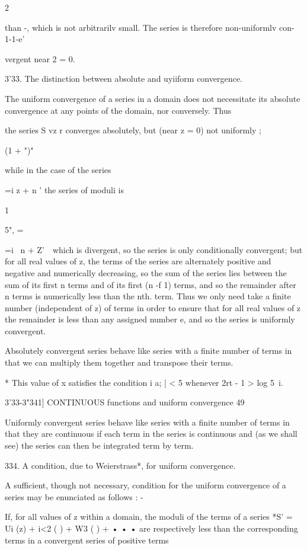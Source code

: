 2

than -, which is not arbitrarilv small. The series is therefore
non-uniformlv con- 1-1-e'

vergent near 2 = 0.

3'33. The distinction between absolute and uyiiform convergence.

The uniform convergence of a series in a domain does not necessitate
its absolute convergence at any points of the domain, nor conversely.
Thus

the series S vz r converges absolutely, but (near z = 0) not uniformly
;

(1 + ")"

while in the case of the series

 =i z + n ' the series of moduli is

1

5", =



 =i \ n + Z'\ \ which is divergent, so the series is only
conditionally convergent; but for all real values of z, the terms of
the series are alternately positive and negative and numerically
decreasing, so the sum of the series lies between the sum of its first
n terms and of its first (n -f 1) terms, and so the remainder after n
terms is numerically less than the nth. term. Thus we only need take a
finite number (independent of z) of terms in order to ensure that for
all real values of z the remainder is less than any assigned number e,
and so the series is uniformly convergent.

Absolutely convergent series behave like series with a finite number
of terms in that we can multiply them together and transpose their
terms.

* This value of x satisfies the condition i a; | < 5 whenever 2rt - 1
> log 5~i.



3'33-3"341] CONTINUOUS functions and uniform convergence 49

Uniformly convergent series behave like series with a finite number of
terms in that they are continuous if each term in the series is
continuous and (as we shall see) the series can then be integrated
term by term.

334. A condition, due to Weierstrass*, for uniform convergence.

A sufficient, though not necessary, condition for the uniform
convergence of a series may be enunciated as follows : -

If, for all values of z within a domain, the moduli of the terms of a
series *S' = Ui (z) + i<2 ( ) + W3 ( ) + • • • are respectively less
than the corresponding terms in a convergent series of positive terms

